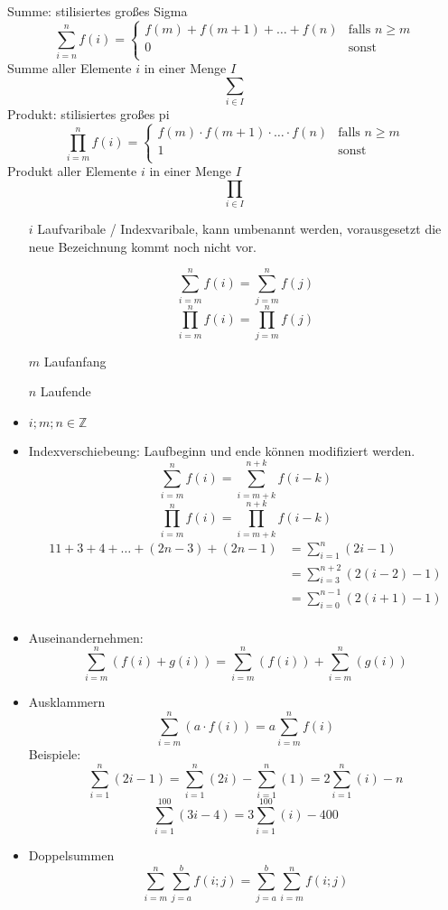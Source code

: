 Summe: stilisiertes großes Sigma
\[\sum\limits_{i = n}^n f(i) = \left \lbrace \begin{array}{ll}
                                                 f(m) + f(m + 1) + \dots + f(n) & \textrm{falls } n \geq m \\
                                                 0                              & \textrm{sonst}           \\
\end{array} \right.\]
Summe aller Elemente $i$ in einer Menge $I$
\[\sum\limits_{i \in I}\]
Produkt: stilisiertes großes pi
\[\prod\limits_{i=m}^{n} f(i) = \left \lbrace \begin{array}{ll}
                                                  f(m) \cdot f(m + 1) \cdot \dots \cdot f(n) & \textrm{falls } n \geq m \\
                                                  1                                          & \textrm{sonst}           \\
\end{array} \right.\]
Produkt aller Elemente $i$ in einer Menge $I$
\[\prod\limits_{i \in I}\]
\begin{itemize}
    \item[$i$] Laufvaribale / Indexvaribale, kann umbenannt werden, vorausgesetzt die neue Bezeichnung kommt noch nicht vor.
    \item[] \[\sum\limits_{i = m}^n f(i) = \sum\limits_{j = m}^n f(j)\]
    \[\prod\limits_{i = m}^n f(i) = \prod\limits_{j = m}^n f(j)\]
    \item[$m$] Laufanfang
    \item[$n$] Laufende
    \item $i;m;n \in \mathbb{Z}$
    \item Indexverschiebeung: Laufbeginn und ende können modifiziert werden.
    \[\sum\limits_{i=m}^n f(i) = \sum\limits_{i=m+k}^{n+k} f(i-k)\]
    \[\prod\limits_{i=m}^n f(i) = \prod\limits_{i=m+k}^{n+k} f(i-k)\]
    \begin{alignat*}{1}
        1+3+4+\dots+(2n-3)+(2n-1) & = \sum\limits_{i = 1}^n (2i-1)             \\
        & = \sum\limits_{i = 3}^{n + 2} (2(i - 2)-1) \\
        & = \sum\limits_{i = 0}^{n - 1} (2(i + 1)-1) \\
    \end{alignat*}
    \item Auseinandernehmen:
    \[\sum\limits_{i=m}^n (f(i) + g(i)) = \sum\limits_{i=m}^n (f(i)) + \sum\limits_{i=m}^n (g(i))\]
    \item Ausklammern
    \[\sum\limits_{i=m}^n (a \cdot f(i)) = a \sum\limits_{i=m}^n f(i)\]
    Beispiele:
    \[\sum\limits_{i=1}^n (2i-1) = \sum\limits_{i=1}^n (2i) - \sum\limits_{i=1}^n (1) = 2\sum\limits_{i=1}^n (i) - n\]
    \[\sum\limits_{i=1}^{100} (3i-4) = 3\sum\limits_{i=1}^{100} (i) - 400\]
    \item Doppelsummen
    \[\sum\limits_{i=m}^n \sum\limits_{j=a}^b f(i; j) = \sum\limits_{j=a}^b \sum\limits_{i=m}^n f(i; j)\]
\end{itemize}
